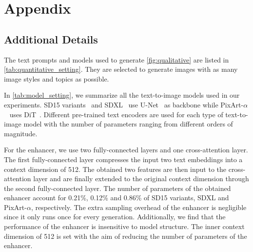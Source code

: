 \appendix
\onecolumn
\section{Appendix}
\label{sec:app}

\subsection{Additional Details}
\label{sec:app_details}

The text prompts and models used to generate \cref{fig:qualitative} are listed in \cref{tab:quantitative_setting}. They are selected to generate images with as many image styles and topics as possible.

In \cref{tab:model_setting}, we summarize all the text-to-image models used in our experiments. SD15 variants~\cite{rombach2022ldm} and SDXL~\cite{podell2024sdxl} use U-Net~\cite{ronneberger2015u} as backbone while PixArt-$\alpha$~\cite{chen2024pixart} uses DiT~\cite{peebles2023scalable}. Different pre-trained text encoders are used for each type of text-to-image model with the number of parameters ranging from different orders of magnitude. 

For the enhancer, we use two fully-connected layers and one cross-attention layer. The first fully-connected layer compresses the input two text embeddings into a context dimension of 512. The obtained two features are then input to the cross-attention layer and are finally extended to the original context dimension through the second fully-connected layer. The number of parameters of the obtained enhancer account for 0.21\%, 0.12\% and 0.86\% of SD15 variants, SDXL and PixArt-$\alpha$, respectively.
The extra sampling overhead of the enhancer is negligible since it only runs once for every generation. Additionally, we find that the performance of the enhancer is insensitive to model structure. The inner context dimension of 512 is set with the aim of reducing the number of parameters of the enhancer.



